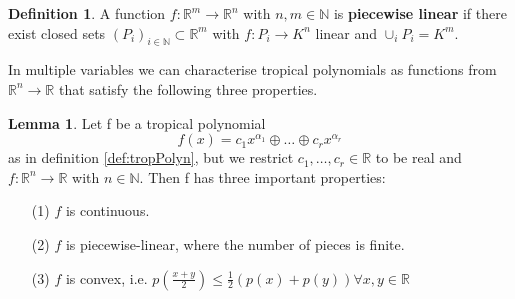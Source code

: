 \documentclass{article}
\theoremstyle{definition}
\newtheorem{lemma}[theorem]{Lemma}
\newtheorem{definition}[theorem]{Definition}
\begin{document}
\begin{definition}
A function $f : \mathbb{R}^{m} \to \mathbb{R}^{n}$ with $n, m \in \mathbb{N}$ is \textbf{piecewise linear} if there exist closed sets $(P_{i})_{i \in \mathbb{N}} \subset \mathbb{R}^{m}$ with $f : P_{i} \to K^{n}$ linear and $\cup_{i}P_{i} = K^{m}$.
\end{definition}

In multiple variables we can characterise tropical polynomials as functions from $\mathbb{R}^{n} \to \mathbb{R}$ that satisfy the following three properties.

\begin{lemma}\hspace{1sp}\cite{maclagan2015introduction}\label{lemma:trop_properties}
Let f be a tropical polynomial
$$ f(x) = c_1 x^{\alpha_1} \oplus \dots \oplus c_r x^{\alpha_r}$$ as in definition \ref{def:tropPolyn}, but we restrict $c_1, \dots , c_r \in \mathbb{R}$ to be real and $f: \mathbb{R}^{n} \to \mathbb{R}$ with $n \in \mathbb{N}$. Then f has three important properties:
\begin{itemize}
\item[(1)]
$f$ is continuous.
\item[(2)]
$f$ is piecewise-linear, where the number of pieces is finite.
\item[(3)]
$f$ is convex, i.e. $p(\frac{x + y}{2}) \leq \frac{1}{2}(p(x)+p(y)) \forall x,y \in \mathbb{R}$
\end{itemize}
\end{lemma}
\end{document}
